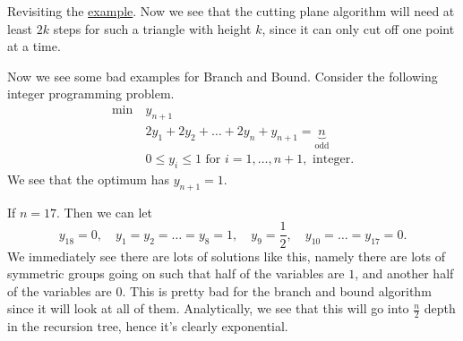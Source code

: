 Revisiting the \hyperref[eg:branch-and-bound]{example}. Now we see that the cutting plane algorithm will need at least \(2k\) steps
for such a triangle with height \(k\), since it can only cut off one point at a time.

\hr

\begin{eg}
	Now we see some bad examples for Branch and Bound. Consider the following integer programming problem.
	\begin{align*}
		\min~ & y_{n+1}                                                              \\
		      & 2y_{1} + 2y_2 + \ldots +2y_n + y_{n+1} = \underbrace{n}_{\text{odd}} \\
		      & 0\leq y_{i}\leq 1 \text{ for }i = 1, \ldots , n+1, \text{ integer}.
	\end{align*}
	We see that the optimum has \(y_{n+1} = 1\).

	If \(n = 17\). Then we can let
	\[
		y_{18} = 0,\quad y_1 = y_2 = \ldots = y_8 = 1,\quad y_9 = \frac{1}{2},\quad y_{10} = \ldots = y_{17} = 0.
	\]
	We immediately see there are lots of solutions like this, namely there are lots of symmetric groups going on such that
	half of the variables are \(1\), and another half of the variables are \(0\). This is pretty bad
	for the branch and bound algorithm since it will look at all of them. Analytically, we see that this will go into \(\frac{n}{2}\)
	depth in the recursion tree, hence it's clearly exponential.
\end{eg}